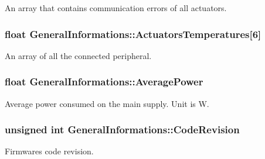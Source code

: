 An array that contains communication errors of all actuators. 

\subsubsection[{\texorpdfstring{Actuators\+Temperatures}{ActuatorsTemperatures}}]{\setlength{\rightskip}{0pt plus 5cm}float General\+Informations\+::\+Actuators\+Temperatures\mbox{[}6\mbox{]}}\hypertarget{struct_general_informations_ad763ff96b47d372343c3f446e9b47463}{}\label{struct_general_informations_ad763ff96b47d372343c3f446e9b47463}


An array of all the connected peripheral. 

\subsubsection[{\texorpdfstring{Average\+Power}{AveragePower}}]{\setlength{\rightskip}{0pt plus 5cm}float General\+Informations\+::\+Average\+Power}\hypertarget{struct_general_informations_ad7ad2bf957aa53d28a43897efe201b56}{}\label{struct_general_informations_ad7ad2bf957aa53d28a43897efe201b56}


Average power consumed on the main supply. Unit is W. 

\subsubsection[{\texorpdfstring{Code\+Revision}{CodeRevision}}]{\setlength{\rightskip}{0pt plus 5cm}unsigned int General\+Informations\+::\+Code\+Revision}\hypertarget{struct_general_informations_a56f6f5dc8067f0ea4deb4b0c5cc3f971}{}\label{struct_general_informations_a56f6f5dc8067f0ea4deb4b0c5cc3f971}


Firmware\textquotesingle{}s code revision. 

